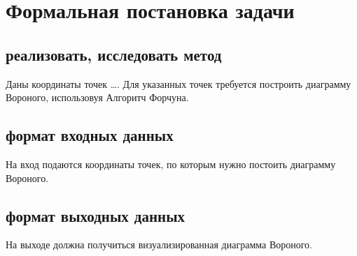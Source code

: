 \documentclass[12 pt, a4paper]{article}
\begin{document}
\section{Формальная постановка задачи}
\subsection{реализовать, исследовать метод}
Даны координаты точек …. Для указанных точек требуется построить диаграмму Вороного, использовуя Алгоритч Форчуна.
\subsection{формат входных данных}
На вход подаются координаты точек, по которым нужно постоить диаграмму Вороного.
\subsection{формат выходных данных}
На выходе должна получиться визуализированная диаграмма Вороного.
\end{document}
